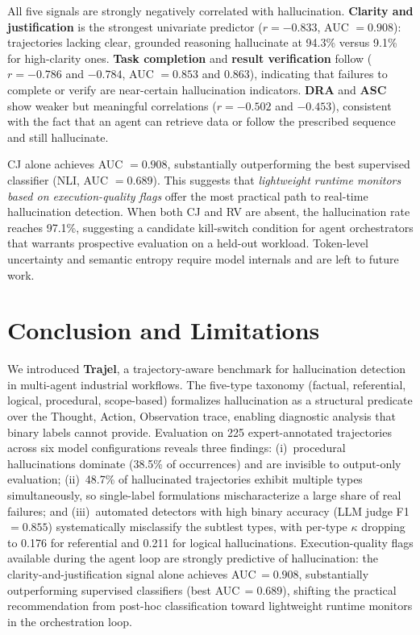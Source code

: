 \documentclass{article}
\begin{document}
All five signals are strongly negatively correlated with hallucination. \textbf{Clarity and justification} is the strongest univariate predictor ($r = -0.833$, AUC $= 0.908$): trajectories lacking clear, grounded reasoning hallucinate at 94.3\% versus 9.1\% for high-clarity ones. \textbf{Task completion} and \textbf{result verification} follow ($r = -0.786$ and $-0.784$, AUC $= 0.853$ and $0.863$), indicating that failures to complete or verify are near-certain hallucination indicators. \textbf{DRA} and \textbf{ASC} show weaker but meaningful correlations ($r = -0.502$ and $-0.453$), consistent with the fact that an agent can retrieve data or follow the prescribed sequence and still hallucinate.

CJ alone achieves AUC $= 0.908$, substantially outperforming the best supervised classifier (NLI, AUC $= 0.689$). This suggests that \emph{lightweight runtime monitors based on execution-quality flags} offer the most practical path to real-time hallucination detection. When both CJ and RV are absent, the hallucination rate reaches 97.1\%, suggesting a candidate kill-switch condition for agent orchestrators that warrants prospective evaluation on a held-out workload. Token-level uncertainty and semantic entropy require model internals and are left to future work.

\section{Conclusion and Limitations}
\label{sec:conclusion}

We introduced \textbf{Trajel}, a trajectory-aware benchmark for hallucination detection in multi-agent industrial workflows. The five-type taxonomy (factual, referential, logical, procedural, scope-based) formalizes hallucination as a structural predicate over the Thought, Action, Observation trace, enabling diagnostic analysis that binary labels cannot provide. Evaluation on 225 expert-annotated trajectories across six model configurations reveals three findings: (i)~procedural hallucinations dominate (38.5\% of occurrences) and are invisible to output-only evaluation; (ii)~48.7\% of hallucinated trajectories exhibit multiple types simultaneously, so single-label formulations mischaracterize a large share of real failures; and (iii)~automated detectors with high binary accuracy (LLM judge F1\,$= 0.855$) systematically misclassify the subtlest types, with per-type $\kappa$ dropping to 0.176 for referential and 0.211 for logical hallucinations. Execution-quality flags available during the agent loop are strongly predictive of hallucination: the clarity-and-justification signal alone achieves AUC\,$= 0.908$, substantially outperforming supervised classifiers (best AUC\,$= 0.689$), shifting the practical recommendation from post-hoc classification toward lightweight runtime monitors in the orchestration loop.
\end{document}
